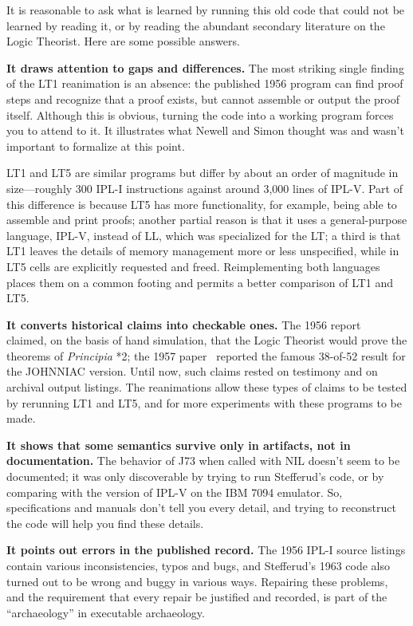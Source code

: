 \documentclass[journal]{IEEEtran}
\begin{document}
%
%

It is reasonable to ask what is learned by running this old code that
could not be learned by reading it, or by reading the abundant
secondary literature on the Logic Theorist. Here are some
possible answers.

\textbf{It draws attention to gaps and differences.}
The most striking single finding of the LT1 reanimation is an
absence: the published 1956 program can find proof steps and 
recognize that a proof exists, but cannot assemble
or output the proof itself.  Although this is obvious, turning
the code into a working program forces you to attend to it. 
It illustrates what Newell and Simon
thought was and wasn't important to formalize at this point.

LT1 and LT5 are similar programs but
differ by about an order of magnitude in size---roughly 300
IPL-I instructions against around 3,000 lines of
IPL-V.  Part of this difference is because LT5 has more
functionality, for example, being able to
assemble and print proofs; another partial reason is that it uses
a general-purpose language, IPL-V, instead of LL, which was
specialized for the LT; a third is that LT1 leaves the details
of memory management more or less unspecified, while in LT5
cells are explicitly requested and freed.  Reimplementing 
both languages places them on a common footing and permits a 
better comparison of LT1 and LT5.

\textbf{It converts historical claims into checkable ones.} The 1956
report~\cite{cip1956} claimed, on the basis of hand simulation, that the Logic
Theorist would prove the theorems of \textit{Principia} *2; the 
1957 paper~\cite{LT1957} reported the famous 38-of-52 result for the JOHNNIAC version.
Until now, such claims rested on testimony and on archival output
listings.  The reanimations allow these types of claims to be tested
by rerunning LT1 and LT5, and for more experiments with these
programs to be made.

\textbf{It shows that some semantics survive only in artifacts, not
in documentation.}  The behavior of J73 when called with NIL
doesn't seem to be documented; it was
only discoverable by trying to run Stefferud's code, or by
comparing with the version of IPL-V on the IBM 7094 emulator.
So, specifications and manuals don't tell you every detail,
and trying to reconstruct the code will help you find these
details.

\textbf{It points out errors in the published record.}  The 1956 
IPL-I source listings contain various inconsistencies, typos and
bugs, and Stefferud's 1963 code also turned out to be wrong and
buggy in various ways.  Repairing these problems, and the requirement
that every repair be justified and recorded, is part of the ``archaeology''
in executable archaeology.
\end{document}

